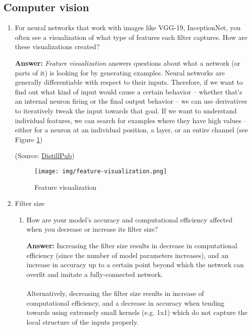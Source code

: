 \documentclass{article}
\newenvironment{QandA}{\begin{enumerate}[label=\arabic*.]}{\end{enumerate}}
\newenvironment{InnerQandA}{\begin{enumerate}[label=\roman*.]}{\end{enumerate}}
\newenvironment{answer}{\par\normalfont \textbf{Answer:}}{}
\begin{document}
\subsection{Computer vision}
\begin{QandA}
    \item For neural networks that work with images like VGG-19, InceptionNet, you often see a visualization of what type of features each filter captures. How are these visualizations created?
    \begin{answer}
        \textit{Feature visualization} answers questions about what a network (or parts of it) is looking for by generating examples. Neural networks are generally differentiable with respect to their inputs. Therefore, if we want to find out what kind of input would cause a certain behavior -- whether that's an internal neuron firing or the final output behavior -- we can use derivatives to iteratively tweak the input towards that goal. If we want to understand individual features, we can search for examples where they have high values -- either for a neuron at an individual position, a layer, or an entire channel (see Figure \ref{fig:feature-visualization})

        (Source: \href{https://distill.pub/2017/feature-visualization/}{DistillPub})
    \end{answer}
    \begin{figure}[h!]
        \centering
        \texttt{[image: img/feature-visualization.png]}
        \caption{Feature visualization}
        \label{fig:feature-visualization}
    \end{figure}

    \item Filter size
    \begin{InnerQandA}
        \item How are your model’s accuracy and computational efficiency affected when you decrease or increase its filter size?
        \begin{answer}
            Increasing the filter size results in decrease in computational efficiency (since the number of model parameters increases), and an increase in accuracy up to a certain point beyond which the network can overfit and imitate a fully-connected network. \\\\
            Alternatively, decreasing the filter size results in increase of computational efficiency, and a decrease in accuracy when tending towards using extremely small kernels (e.g. 1x1) which do not capture the local structure of the inputs properly.
        \end{answer}


\end{InnerQandA}
\end{QandA}
\end{document}

